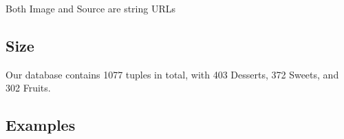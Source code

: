 \documentclass[12pt, oneside]{scrreprt}
\begin{document}
Both Image and Source are string URLs

\subsection*{Size}
Our database contains 1077 tuples in total, with 403 Desserts, 372 Sweets, and 302 Fruits.

\subsection*{Examples}
\end{document}
